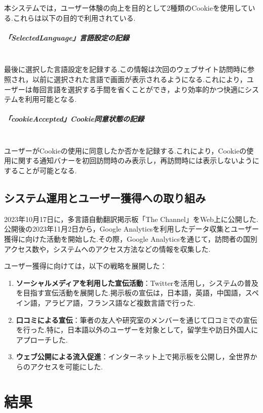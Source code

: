 \documentclass[b5paper,12pt,dvipdfmx]{jsreport}
\begin{document}
本システムでは，ユーザー体験の向上を目的として2種類のCookieを使用している.これらは以下の目的で利用されている.

\paragraph{「SelectedLanguage」言語設定の記録}\mbox{}\\
最後に選択した言語設定を記録する.この情報は次回のウェブサイト訪問時に参照され，以前に選択された言語で画面が表示されるようになる.これにより，ユーザーは毎回言語を選択する手間を省くことができ，より効率的かつ快適にシステムを利用可能となる.

\paragraph{「cookieAccepted」Cookie同意状態の記録}\mbox{}\\
ユーザーがCookieの使用に同意したか否かを記録する.これにより，Cookieの使用に関する通知バナーを初回訪問時のみ表示し，再訪問時には表示しないようにすることが可能となる.


\section{システム運用とユーザー獲得への取り組み}

2023年10月17日に，多言語自動翻訳掲示板「The Channel」をWeb上に公開した.公開後の2023年11月2日から，Google Analyticsを利用したデータ収集とユーザー獲得に向けた活動を開始した.その際，Google Analyticsを通じて，訪問者の国別アクセス数や，システムへのアクセス方法などの情報を収集した.

ユーザー獲得に向けては，以下の戦略を展開した：
\begin{enumerate}
    \item \textbf{ソーシャルメディアを利用した宣伝活動}：Twitterを活用し，システムの普及を目指す宣伝活動を展開した.掲示板の宣伝は，日本語，英語，中国語，スペイン語，アラビア語，フランス語など複数言語で行った.
    \item \textbf{口コミによる宣伝}：筆者の友人や研究室のメンバーを通じて口コミでの宣伝を行った.特に，日本語以外のユーザーを対象として，留学生や訪日外国人にアプローチした.
    \item \textbf{ウェブ公開による流入促進}：インターネット上で掲示板を公開し，全世界からのアクセスを可能にした.
\end{enumerate}

\chapter{結果}
\end{document}
